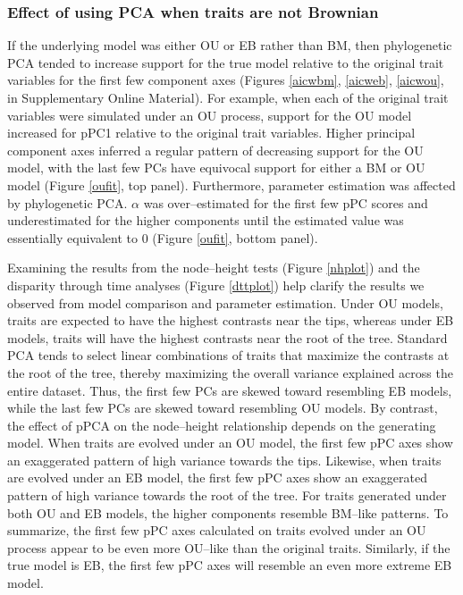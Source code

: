 \documentclass[a4paper,12pt]{article}
\begin{document}
\subsubsection{Effect of using PCA when traits are not Brownian}
If the underlying model was either OU or EB rather than BM, then phylogenetic PCA tended to increase support for the true model relative to the original trait variables for the first few component axes (Figures \ref{aicwbm}, \ref{aicweb}, \ref{aicwou}, in Supplementary Online Material). For example, when each of the original trait variables were simulated under an OU process, support for the OU model increased for pPC1 relative to the original trait variables. Higher principal component axes inferred a regular pattern of decreasing support for the OU model, with the last few PCs have equivocal support for either a BM or OU model (Figure \ref{oufit}, top panel). Furthermore, parameter estimation was affected by phylogenetic PCA. $\alpha$ was over--estimated for the first few pPC scores and underestimated for the higher components until the estimated value was essentially equivalent to 0 (Figure \ref{oufit}, bottom panel). 

Examining the results from the node--height tests (Figure \ref{nhplot}) and the disparity through time analyses (Figure \ref{dttplot}) help clarify the results we observed from model comparison and parameter estimation. 
Under OU models, traits are expected to have the highest contrasts near the tips, whereas under EB models, traits will have the highest contrasts near the root of the tree. Standard PCA tends to select linear combinations of traits that maximize the contrasts at the root of the tree, thereby maximizing the overall variance explained across the entire dataset. Thus, the first few PCs are skewed toward resembling EB models, while the last few PCs are skewed toward resembling OU models. By contrast, the effect of pPCA on the node--height relationship depends on the generating model. When traits are evolved under an OU model, the first few pPC axes show an exaggerated pattern of high variance towards the tips. Likewise, when traits are evolved under an EB model, the first few pPC axes show an exaggerated pattern of high variance towards the root of the tree. For traits generated under both OU and EB models, the higher components resemble BM--like patterns. To summarize, the first few pPC axes calculated on traits evolved under an OU process appear to be even more OU--like than the original traits. Similarly, if the true model is EB, the first few pPC axes will resemble an even more extreme EB model.
\end{document}
